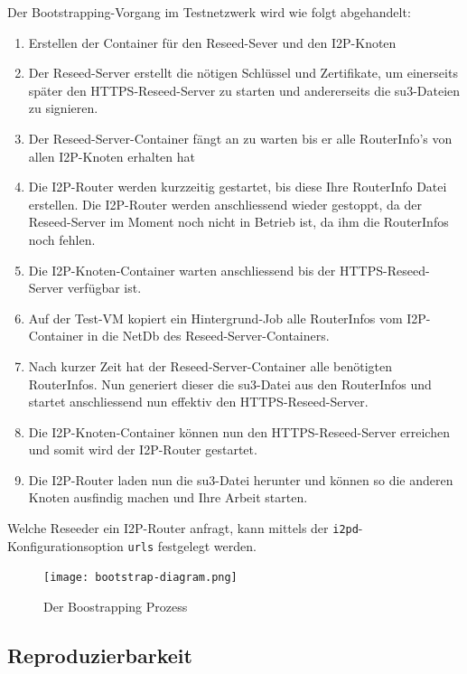 Der Bootstrapping-Vorgang im Testnetzwerk wird wie folgt abgehandelt:

\begin{enumerate}
    \item Erstellen der Container für den Reseed-Sever und den I2P-Knoten
    \item Der Reseed-Server erstellt die nötigen Schlüssel und Zertifikate, um einerseits später den HTTPS-Reseed-Server zu starten und andererseits die su3-Dateien zu signieren.
    \item Der Reseed-Server-Container fängt an zu warten bis er alle RouterInfo's von allen I2P-Knoten erhalten hat
    \item Die I2P-Router werden kurzzeitig gestartet, bis diese Ihre RouterInfo Datei erstellen. Die I2P-Router werden anschliessend wieder gestoppt, da der Reseed-Server im Moment noch nicht in Betrieb ist, da ihm die RouterInfos noch fehlen.
    \item Die I2P-Knoten-Container warten anschliessend bis der HTTPS-Reseed-Server verfügbar ist.
    \item Auf der Test-VM kopiert ein Hintergrund-Job alle RouterInfos vom I2P-Container in die NetDb des Reseed-Server-Containers.
    \item Nach kurzer Zeit hat der Reseed-Server-Container alle benötigten RouterInfos. Nun generiert dieser die su3-Datei aus den RouterInfos und startet anschliessend nun effektiv den HTTPS-Reseed-Server.
    \item Die I2P-Knoten-Container können nun den HTTPS-Reseed-Server erreichen und somit wird der I2P-Router gestartet.
    \item Die I2P-Router laden nun die su3-Datei herunter und können so die anderen Knoten ausfindig machen und Ihre Arbeit starten.
\end{enumerate}

Welche Reseeder ein I2P-Router anfragt, kann mittels der \lstinline|i2pd|-Konfigurationsoption \lstinline|urls| festgelegt werden.


\clearpage
\begin{landscape}%
\begin{figure}[ht]
  \texttt{[image: bootstrap-diagram.png]}
  \caption{Der Boostrapping Prozess}\label{fig:bootstrap-diagram}
\end{figure}
\end{landscape}%


\subsection{Reproduzierbarkeit}

